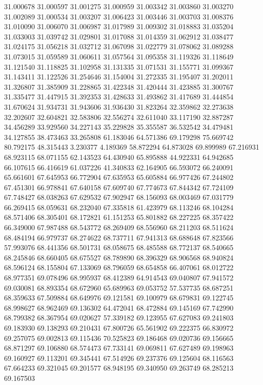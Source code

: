 31.000678
31.000597
31.001275
31.000959
31.003342
31.003860
31.003270
31.002089
31.000534
31.003207
31.006423
31.003446
31.003703
31.008376
31.010090
31.006070
31.006987
31.017989
31.009302
31.018883
31.035204
31.033003
31.039742
31.029801
31.017088
31.014359
31.062912
31.038477
31.024175
31.056218
31.032712
31.067098
31.022779
31.078062
31.089288
31.073015
31.059589
31.060611
31.057564
31.095358
31.119326
31.118649
31.121540
31.118825
31.102958
31.131335
31.071531
31.155771
31.099367
31.143411
31.122526
31.254646
31.154004
31.272335
31.195407
31.202011
31.326807
31.385909
31.228865
31.422348
31.420444
31.423885
31.300767
31.335477
31.447915
31.392353
31.428633
31.493862
31.417689
31.444854
31.670624
31.934731
31.943606
31.936430
31.823264
32.359862
32.273638
32.202607
32.604821
32.583806
32.556274
32.611040
33.117190
32.887287
34.456289
33.929560
34.227143
35.229828
35.355587
36.532542
34.479481
34.127855
38.473463
33.265808
61.183046
64.571386
69.179298
75.669742
80.792175
48.315443
3.230377
4.189369
58.872294
64.873028
69.899989
67.216931
68.923115
68.071155
62.143523
64.430940
65.895888
44.922331
64.942685
66.107615
66.416619
61.037226
41.340833
62.164905
66.593072
66.240091
65.661601
67.645953
66.772904
67.635953
65.605884
66.977426
67.244802
67.451301
66.978841
67.640158
67.609740
67.774673
67.844342
67.724109
67.748427
68.038263
67.629532
67.902947
68.156093
68.003469
67.031779
66.269415
68.059631
68.232040
67.335818
61.423979
68.113246
68.104284
68.571406
68.305401
68.172821
61.151253
65.801882
68.227225
68.357422
66.349000
67.987488
68.543772
68.269409
68.556960
68.211203
68.511624
68.484194
66.979737
68.274622
68.737711
67.941313
68.688648
67.823566
57.993076
68.441356
68.501731
68.058675
68.485588
68.772137
68.540665
68.245846
68.660405
68.675527
68.789890
68.396329
68.906568
68.940824
68.596124
68.155804
67.133069
68.796059
68.654858
66.407061
68.012722
68.977351
69.078496
68.995937
68.412389
64.914543
69.040807
67.941572
69.030081
68.893354
68.672960
65.689963
69.053752
57.537735
68.687251
68.359633
67.509884
68.649976
69.121581
69.100979
68.679831
69.122745
68.998627
68.962469
69.136302
64.472041
68.472884
69.145169
67.742990
68.799382
68.367954
69.020627
57.339182
69.123955
67.627083
69.241803
69.183930
69.138293
69.210431
67.800726
65.561902
69.222375
66.830972
69.257075
69.002813
69.115436
70.525823
69.186468
69.020736
69.156665
68.871297
69.106880
68.574473
67.733141
69.069811
67.627489
69.198963
69.160927
69.113201
69.345441
67.514926
69.237376
69.125604
68.116563
67.664233
69.321045
69.201577
68.948195
69.340950
69.263749
68.285213
69.167503
